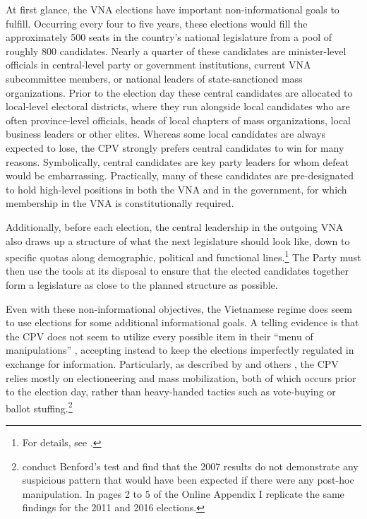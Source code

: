 \documentclass[12pt]{article}
\newcommand\fnote[1]{\footnote{\baselineskip=2\normalbaselineskip#1}}
\newcommand{\1}{\mathbbm{1}}
\begin{document}
At first glance, the VNA elections have important non-informational goals to fulfill. Occurring every four to five years, these elections would fill the approximately 500 seats in the country's national legislature from a pool of roughly 800 candidates. Nearly a quarter of these candidates are minister-level officials in central-level party or government institutions, current VNA subcommittee members, or national leaders of state-sanctioned mass organizations. Prior to the election day these central candidates are allocated to local-level electoral districts, where they run alongside local candidates who are often province-level officials, heads of local chapters of mass organizations, local business leaders or other elites. Whereas some local candidates are always expected to lose, the CPV strongly prefers central candidates to win for many reasons. Symbolically, central candidates are key party leaders for whom defeat would be embarrassing. Practically, many of these candidates are pre-designated to hold high-level positions in both the VNA and in the government, for which membership in the VNA is constitutionally required.

Additionally, before each election, the central leadership in the outgoing VNA also draws up a structure of what the next legislature should look like, down to specific quotas along demographic, political and functional lines.\fnote{For details, see \citet{MaleskySchuler2009}.} The Party must then use the tools at its disposal to ensure that the elected candidates together form a legislature as close to the planned structure as possible.

Even with these non-informational objectives, the Vietnamese regime does seem to use elections for some additional informational goals. A telling evidence is that the CPV does not seem to utilize every possible item in their ``menu of manipulations'' \citep[to quote][]{Schedler2002menu}, accepting instead to keep the elections imperfectly regulated in exchange for information. Particularly, as described by \citet{MaleskySchuler2011} and others \citep[e.g][]{Gainsborough2005}, the CPV relies mostly on electioneering and mass mobilization, both of which occurs prior to the election day, rather than heavy-handed tactics such as vote-buying or ballot stuffing.\fnote{\citet{MaleskySchuler2011} conduct Benford's test and find that the 2007 results do not demonstrate any suspicious pattern that would have been expected if there were any post-hoc manipulation. In pages 2 to 5 of the Online Appendix I replicate the same findings for the 2011 and 2016 elections.}
\end{document}
